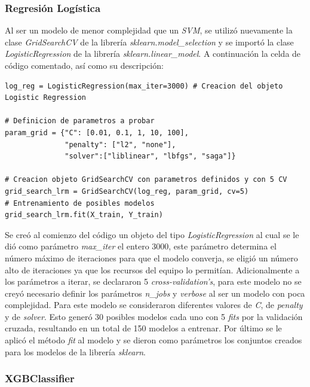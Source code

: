 \subsubsection{Regresión Logística}

Al ser un modelo de menor complejidad que un \textit{SVM}, se utilizó nuevamente la clase \textit{GridSearchCV} de la librería \textit{sklearn.model\_selection} y se importó la clase \textit{LogisticRegression} de la librería \textit{sklearn.linear\_model}. A continuación la celda de código comentado, así como su descripción: \\

\begin{lstlisting}[caption={Código \textit{GridSearchCV} para \textit{LogisticRegression}}]
log_reg = LogisticRegression(max_iter=3000) # Creacion del objeto Logistic Regression

# Definicion de parametros a probar
param_grid = {"C": [0.01, 0.1, 1, 10, 100], 
              "penalty": ["l2", "none"], 
              "solver":["liblinear", "lbfgs", "saga"]}

# Creacion objeto GridSearchCV con parametros definidos y con 5 CV
grid_search_lrm = GridSearchCV(log_reg, param_grid, cv=5)
# Entrenamiento de posibles modelos
grid_search_lrm.fit(X_train, Y_train)
\end{lstlisting}

Se creó al comienzo del código un objeto del tipo \textit{LogisticRegression} al cual se le dió como parámetro \textit{max\_iter} el entero 3000, este parámetro determina el número máximo de iteraciones para que el modelo converja, se eligió un número alto de iteraciones ya que los recursos del equipo lo permitían. Adicionalmente a los parámetros a iterar, se declararon 5 \textit{cross-validation's}, para este modelo no se creyó necesario definir los parámetros \textit{n\_jobs} y \textit{verbose} al ser un modelo con poca complejidad. Para este modelo se consideraron diferentes valores de \textit{C}, de \textit{penalty} y de \textit{solver}. Esto generó 30 posibles modelos cada uno con 5 \textit{fits} por la validación cruzada, resultando en un total de 150 modelos a entrenar. Por último se le aplicó el método \textit{fit} al modelo y se dieron como parámetros los conjuntos creados para los modelos de la librería \textit{sklearn}.

\subsubsection{XGBClassifier}

